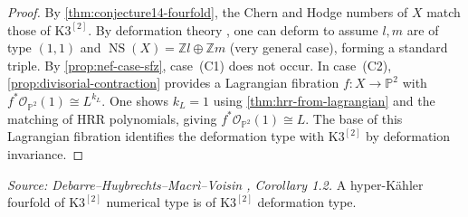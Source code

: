 \begin{proof}
  By \cref{thm:conjecture14-fourfold}, the Chern and Hodge numbers of \(X\) match those
  of \(\mathrm{K3}^{[2]}\).  By deformation theory \cite[Theorem~1.3]{Ma4}, one can
  deform to assume \(l, m\) are of type \((1,1)\) and \(\operatorname{NS}(X) = \mathbb{Z}l \oplus \mathbb{Z}m\)
  (very general case), forming a standard triple.  By \cref{prop:nef-case-sfz},
  case~(C1) does not occur.  In case~(C2), \cref{prop:divisorial-contraction} provides a
  Lagrangian fibration \(f \colon X \to \mathbb{P}^2\) with
  \(f^*\mathcal{O}_{\mathbb{P}^2}(1) \cong L^{k_L}\).  One shows \(k_L = 1\) using
  \cref{thm:hrr-from-lagrangian} and the matching of HRR polynomials, giving
  \(f^*\mathcal{O}_{\mathbb{P}^2}(1) \cong L\).  The base of this Lagrangian fibration
  identifies the deformation type with \(\mathrm{K3}^{[2]}\) by deformation invariance.
\end{proof}

\begin{corollary}
  \label{cor:ogrady-conjecture}
  \textit{Source: Debarre--Huybrechts--Macr\`i--Voisin \cite{MR4654610}, Corollary 1.2.}
  A hyper-K\"ahler fourfold of \(\mathrm{K3}^{[2]}\) numerical type is of
  \(\mathrm{K3}^{[2]}\) deformation type.
\end{corollary}

